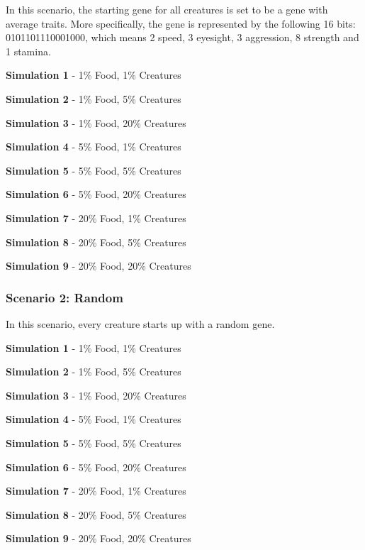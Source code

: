 \documentclass{article}
\begin{document}
In this scenario, the starting gene for all creatures is set to be a gene with average traits. More specifically, the gene is represented by the following 16 bits: 0101101110001000, which means 2 speed, 3 eyesight, 3 aggression, 8 strength and 1 stamina.

\textbf{Simulation 1} - 1\% Food, 1\% Creatures

\textbf{Simulation 2} - 1\% Food, 5\% Creatures

\textbf{Simulation 3} - 1\% Food, 20\% Creatures

\textbf{Simulation 4} - 5\% Food, 1\% Creatures

\textbf{Simulation 5} - 5\% Food, 5\% Creatures

\textbf{Simulation 6} - 5\% Food, 20\% Creatures

\textbf{Simulation 7} - 20\% Food, 1\% Creatures

\textbf{Simulation 8} - 20\% Food, 5\% Creatures

\textbf{Simulation 9} - 20\% Food, 20\% Creatures

\subsubsection{Scenario 2: Random}

In this scenario, every creature starts up with a random gene.

\textbf{Simulation 1} - 1\% Food, 1\% Creatures

\textbf{Simulation 2} - 1\% Food, 5\% Creatures

\textbf{Simulation 3} - 1\% Food, 20\% Creatures

\textbf{Simulation 4} - 5\% Food, 1\% Creatures

\textbf{Simulation 5} - 5\% Food, 5\% Creatures

\textbf{Simulation 6} - 5\% Food, 20\% Creatures

\textbf{Simulation 7} - 20\% Food, 1\% Creatures

\textbf{Simulation 8} - 20\% Food, 5\% Creatures

\textbf{Simulation 9} - 20\% Food, 20\% Creatures
\end{document}

